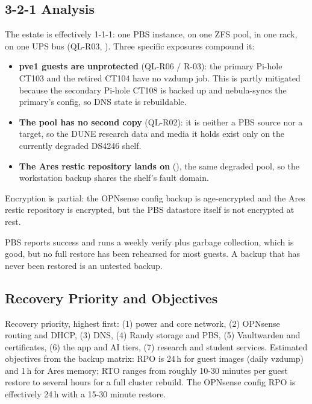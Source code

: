 \subsection{3-2-1 Analysis}

The estate is effectively 1-1-1: one PBS instance, on one ZFS pool, in one rack, on one
UPS bus (QL-R03, \sevhigh). Three specific exposures compound it:

\begin{itemize}
\item \textbf{pve1 guests are unprotected} (QL-R06 / R-03): the primary Pi-hole CT103 and
the retired CT104 have no vzdump job. This is partly mitigated because the secondary
Pi-hole CT108 is backed up and nebula-syncs the primary's config, so DNS state is
rebuildable.
\item \textbf{The  pool has no second copy} (QL-R02): it is neither a PBS
source nor a target, so the DUNE research data and media it holds exist only on the
currently degraded DS4246 shelf.
\item \textbf{The Ares restic repository lands on } (), the same degraded pool, so the workstation backup shares the shelf's
fault domain.
\end{itemize}

Encryption is partial: the OPNsense config backup is age-encrypted and the Ares restic
repository is encrypted, but the PBS datastore itself is not encrypted at rest.

\begin{callout}[title=Do not assume a green job is a recoverable backup]
PBS reports success and runs a weekly verify plus garbage collection, which is good, but
no full restore has been rehearsed for most guests. A backup that has never been restored
is an untested backup.
\end{callout}

\subsection{Recovery Priority and Objectives}

Recovery priority, highest first: (1) power and core network, (2) OPNsense routing and
DHCP, (3) DNS, (4) Randy storage and PBS, (5) Vaultwarden and certificates, (6) the app
and AI tiers, (7) research and student services. Estimated objectives from the backup
matrix: RPO is 24\,h for guest images (daily vzdump) and 1\,h for Ares memory; RTO ranges
from roughly 10-30 minutes per guest restore to several hours for a full cluster rebuild.
The OPNsense config RPO is effectively 24\,h with a 15-30 minute restore.

